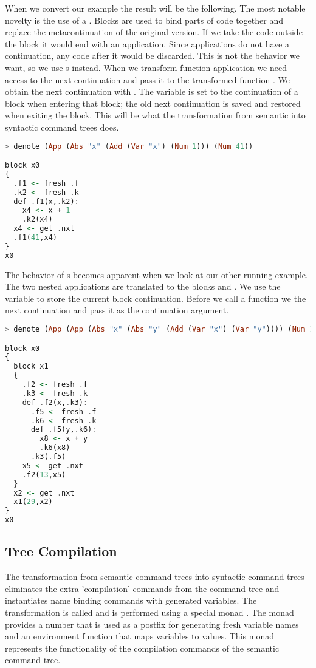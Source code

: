 When we convert our example the result will be the following. The most notable novelty is the use of a . Blocks are used to bind parts of code together and replace the metacontinuation of the original version. If we take the code outside the block it would end with an application. Since applications do not have a continuation, any code after it would be discarded. This is not the behavior we want, so we use s instead. When we transform function application we need access to the next continuation and pass it to the transformed function . We obtain the next continuation with . The variable  is set to the continuation of a block when entering that block; the old next continuation is saved and restored when exiting the block. This will be what the transformation from semantic into syntactic command trees does.

\begin{lstlisting}[language=Haskell]
> denote (App (Abs "x" (Add (Var "x") (Num 1))) (Num 41))

block x0
{
  .f1 <- fresh .f
  .k2 <- fresh .k
  def .f1(x,.k2):
    x4 <- x + 1
    .k2(x4)
  x4 <- get .nxt
  .f1(41,x4)
}
x0
\end{lstlisting}

The behavior of s becomes apparent when we look at our other running example. The two nested applications are translated to the blocks  and . We use the variable  to store the current block continuation. Before we call a function we  the next continuation and pass it as the continuation argument.

\begin{lstlisting}[language=Haskell]
> denote (App (App (Abs "x" (Abs "y" (Add (Var "x") (Var "y")))) (Num 13)) (Num 29))

block x0
{
  block x1
  {
    .f2 <- fresh .f
    .k3 <- fresh .k
    def .f2(x,.k3):
      .f5 <- fresh .f
      .k6 <- fresh .k
      def .f5(y,.k6):
        x8 <- x + y
        .k6(x8)
      .k3(.f5)
    x5 <- get .nxt
    .f2(13,x5)
  }
  x2 <- get .nxt
  x1(29,x2)
}
x0
\end{lstlisting}

\subsection{\label{subsection:semtosyn}Tree Compilation}
The transformation from semantic command trees into syntactic command trees eliminates the extra 'compilation' commands from the command tree and instantiates name binding commands with generated variables. The transformation is called  and is performed using a special monad . The monad  provides a number that is used as a postfix for generating fresh variable names and an environment function that maps variables to values. This monad represents the functionality of the compilation commands of the semantic command tree.

